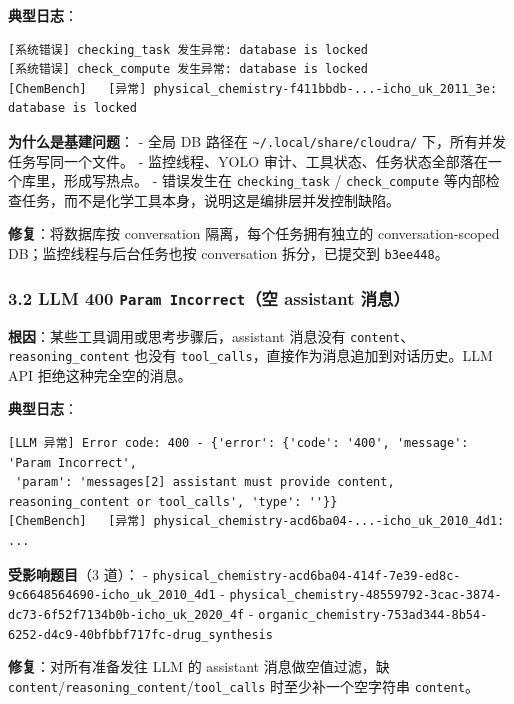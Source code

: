 \documentclass[
]{achemso}
\begin{document}
\textbf{典型日志}：

\begin{verbatim}
[系统错误] checking_task 发生异常: database is locked
[系统错误] check_compute 发生异常: database is locked
[ChemBench]   [异常] physical_chemistry-f411bbdb-...-icho_uk_2011_3e: database is locked
\end{verbatim}

\textbf{为什么是基建问题}： - 全局 DB 路径在
\texttt{\textasciitilde{}/.local/share/cloudra/}
下，所有并发任务写同一个文件。 - 监控线程、YOLO
审计、工具状态、任务状态全部落在一个库里，形成写热点。 - 错误发生在
\texttt{checking\_task} / \texttt{check\_compute}
等内部检查任务，而不是化学工具本身，说明这是编排层并发控制缺陷。

\textbf{修复}：将数据库按 conversation 隔离，每个任务拥有独立的
conversation-scoped DB；监控线程与后台任务也按 conversation
拆分，已提交到 \texttt{b3ee448}。

\hypertarget{llm-400-param-incorrectux7a7a-assistant-ux6d88ux606f}{%
\subsubsection{\texorpdfstring{3.2 LLM 400 \texttt{Param\ Incorrect}（空
assistant
消息）}{3.2 LLM 400 Param Incorrect（空 assistant 消息）}}\label{llm-400-param-incorrectux7a7a-assistant-ux6d88ux606f}}

\textbf{根因}：某些工具调用或思考步骤后，assistant 消息没有
\texttt{content}、\texttt{reasoning\_content} 也没有
\texttt{tool\_calls}，直接作为消息追加到对话历史。LLM API
拒绝这种完全空的消息。

\textbf{典型日志}：

\begin{verbatim}
[LLM 异常] Error code: 400 - {'error': {'code': '400', 'message': 'Param Incorrect',
 'param': 'messages[2] assistant must provide content, reasoning_content or tool_calls', 'type': ''}}
[ChemBench]   [异常] physical_chemistry-acd6ba04-...-icho_uk_2010_4d1: ...
\end{verbatim}

\textbf{受影响题目}（3 道）： -
\texttt{physical\_chemistry-acd6ba04-414f-7e39-ed8c-9c6648564690-icho\_uk\_2010\_4d1}
-
\texttt{physical\_chemistry-48559792-3cac-3874-dc73-6f52f7134b0b-icho\_uk\_2020\_4f}
-
\texttt{organic\_chemistry-753ad344-8b54-6252-d4c9-40bfbbf717fc-drug\_synthesis}

\textbf{修复}：对所有准备发往 LLM 的 assistant 消息做空值过滤，缺
\texttt{content}/\texttt{reasoning\_content}/\texttt{tool\_calls}
时至少补一个空字符串 \texttt{content}。
\end{document}

